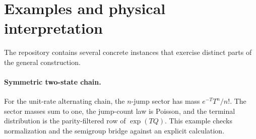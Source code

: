 \section{Examples and physical interpretation}
\label{sec:examples}

The repository contains several concrete instances that exercise distinct parts of the general construction.

\paragraph{Symmetric two-state chain.}
For the unit-rate alternating chain, the $n$-jump sector has mass $e^{-T}T^n/n!$. The sector masses sum to one, the jump-count law is Poisson, and the terminal distribution is the parity-filtered row of $\exp(TQ)$. This example checks normalization and the semigroup bridge against an explicit calculation.

